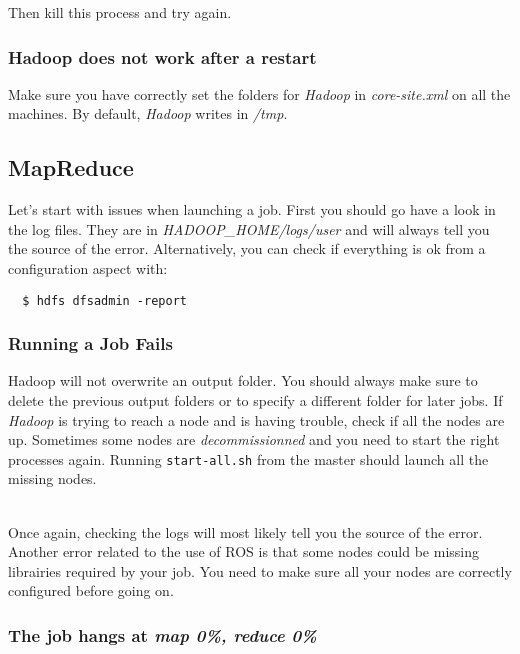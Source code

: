 \documentclass[a4paper, 12pt]{article}
\begin{document}
Then kill this process and try again.

    \subsubsection*{Hadoop does not work after a restart}
    
Make sure you have correctly set the folders for \textit{Hadoop} in \textit{core-site.xml} on all the machines. By default, \textit{Hadoop} writes in \textit{/tmp}.

  \subsection{MapReduce}

Let's start with issues when launching a job. First you should go have a look in the log files. They are in \textit{HADOOP\_HOME/logs/user} and will always tell you the source of the error. Alternatively, you can check if everything is ok from a configuration aspect with:

\begin{verbatim}
  $ hdfs dfsadmin -report
\end{verbatim}
  
    \subsubsection*{Running a Job Fails}

Hadoop will not overwrite an output folder. You should always make sure to delete the previous output folders or to specify a different folder for later jobs. If \textit{Hadoop} is trying to reach a node and is having trouble, check if all the nodes are up. Sometimes some nodes are \textit{decommissionned} and you need to start the right processes again. Running \texttt{start-all.sh} from the master should launch all the missing nodes.

~\\
Once again, checking the logs will most likely tell you the source of the error. Another error related to the use of ROS is that some nodes could be missing librairies required by your job. You need to make sure all your nodes are correctly configured before going on.
   
    \subsubsection*{The job hangs at \textit{map 0\%, reduce 0\%}}
\end{document}
